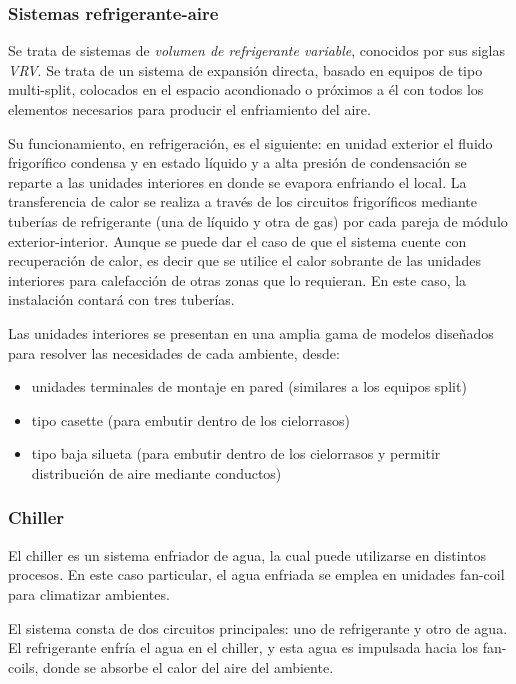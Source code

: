\subsubsection{Sistemas refrigerante-aire}

Se trata de sistemas de \textit{volumen de refrigerante variable}, conocidos por sus siglas \textit{VRV}. Se trata de un sistema de expansi\'on directa, basado en equipos de tipo multi-split, colocados en el espacio acondionado o pr\'oximos a \'el con todos los elementos necesarios para producir el enfriamiento del aire.

Su funcionamiento, en refrigeraci\'on, es el siguiente: en unidad exterior el fluido frigor\'ifico condensa y en estado l\'iquido y a alta presi\'on de condensaci\'on se reparte a las unidades interiores en donde se evapora enfriando el local. La transferencia de calor se realiza a trav\'es de los circuitos frigor\'ificos mediante tuber\'ias de refrigerante (una de l\'iquido y otra de gas) por cada pareja de m\'odulo exterior-interior. Aunque se puede dar el caso de que el sistema cuente con recuperaci\'on de calor, es decir que se utilice el calor sobrante de las unidades interiores para calefacci\'on de otras zonas que lo requieran. En este caso, la instalaci\'on contar\'a con tres tuber\'ias.

Las unidades interiores se presentan en una amplia gama de modelos diseñados para resolver las necesidades de cada ambiente, desde:
\begin{itemize}
	\item unidades terminales de montaje en pared (similares a los equipos split)
	\item tipo casette (para embutir dentro de los cielorrasos)
	\item tipo baja silueta (para embutir dentro de los cielorrasos y permitir distribuci\'on de aire mediante conductos)
\end{itemize}

\subsubsection{Chiller}
El chiller es un sistema enfriador de agua, la cual puede utilizarse en distintos procesos. En este caso particular, el agua enfriada se emplea en unidades fan-coil para climatizar ambientes.

El sistema consta de dos circuitos principales: uno de refrigerante y otro de agua. El refrigerante enfría el agua en el chiller, y esta agua es impulsada hacia los fan-coils, donde se absorbe el calor del aire del ambiente.

